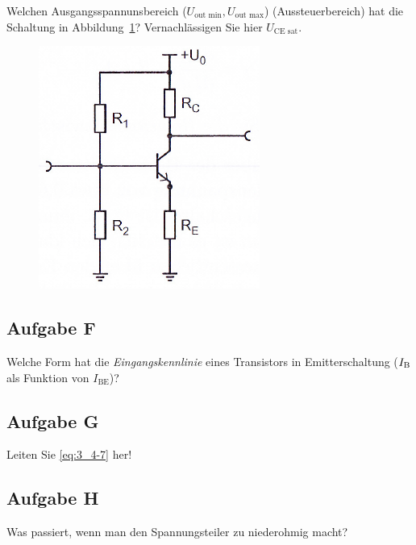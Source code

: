 \begin{problem}
	Welchen Ausgangsspannunsbereich ($U_\text{out min}, U_\text{out max}$)
	(Aussteuerbereich) hat die Schaltung in Abbildung~\ref{fig:3_4-5}?
	Vernachlässigen Sie hier $U_\text{CE sat}$.
\end{problem}

\begin{figure}[htbp]
	\centering
	\includegraphics[width=.4\textwidth]{Anleitung/3_4-5.png}
	\caption{%
		\cite[Abbildung~3/4.5]{physik313-Anleitung}
	}
	\label{fig:3_4-5}
\end{figure}

\fehlt

\FloatBarrier
\subsection{Aufgabe F}

\begin{problem}
	Welche Form hat die \emph{Eingangskennlinie} eines Transistors in
	Emitterschaltung ($I_\text B$ als Funktion von $I_\text{BE}$)?
\end{problem}

\fehlt

\subsection{Aufgabe G}

\begin{problem}
	Leiten Sie \eqref{eq:3_4-7} her!
\end{problem}

\fehlt

\subsection{Aufgabe H}

\begin{problem}
	Was passiert, wenn man den Spannungsteiler zu niederohmig macht?
\end{problem}

